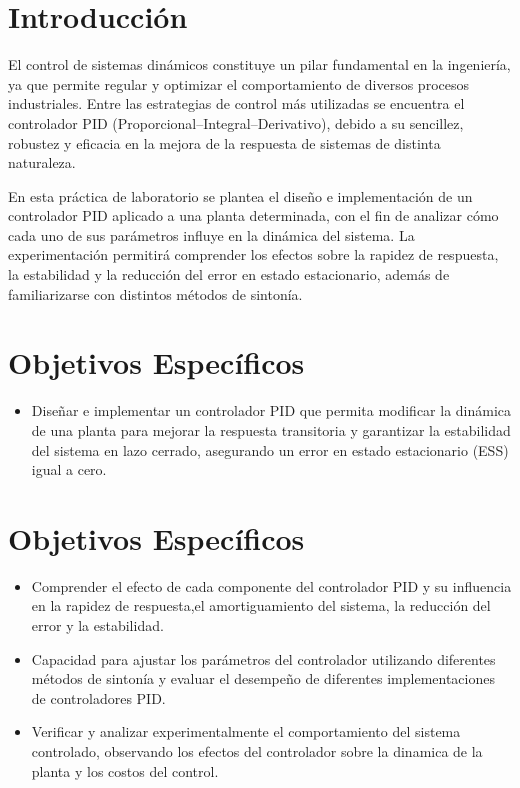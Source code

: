 \section{Introducción}
El control de sistemas dinámicos constituye un pilar fundamental en la ingeniería, ya que permite regular y optimizar el comportamiento de diversos procesos industriales. Entre las estrategias de control más utilizadas se encuentra el controlador PID (Proporcional–Integral–Derivativo), debido a su sencillez, robustez y eficacia en la mejora de la respuesta de sistemas de distinta naturaleza.  

En esta práctica de laboratorio se plantea el diseño e implementación de un controlador PID aplicado a una planta determinada, con el fin de analizar cómo cada uno de sus parámetros influye en la dinámica del sistema. La experimentación permitirá comprender los efectos sobre la rapidez de respuesta, la estabilidad y la reducción del error en estado estacionario, además de familiarizarse con distintos métodos de sintonía.

\section{Objetivos Específicos}
\begin{itemize}
	\item Diseñar e implementar un controlador PID que permita modificar la dinámica de una planta
	para mejorar la respuesta transitoria y garantizar la estabilidad del sistema en lazo cerrado,
	asegurando un error en estado estacionario (ESS) igual a cero.
\end{itemize}

	
\section{Objetivos Específicos}
\begin{itemize}
	\item Comprender el efecto de cada componente del controlador PID y su influencia en la rapidez de
	respuesta,el amortiguamiento del sistema, la reducción del error y la estabilidad.
	\item Capacidad para ajustar los parámetros del controlador utilizando diferentes métodos de sintonía
	y evaluar el desempeño de diferentes implementaciones de controladores PID.
	\item Verificar y analizar experimentalmente el comportamiento del sistema controlado, observando
	los efectos del controlador sobre la dinamica de la planta y los costos del control.
\end{itemize}